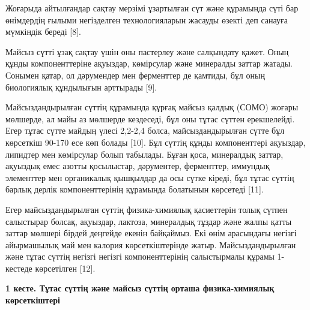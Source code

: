 {Жоғарыда айтылғандар сақтау мерзімі ұзартылған сүт және құрамында сүті
бар өнімдердің ғылыми негізделген технологияларын жасауды өзекті деп
санауға мүмкіндік береді {[}8{]}.

Майсыз сүтті ұзақ сақтау үшін оны пастерлеу және салқындату қажет. Оның
құнды компоненттеріне ақуыздар, көмірсулар және минералды заттар жатады.
Сонымен қатар, ол дәрумендер мен ферменттер де қамтиды, бұл оның
биологиялық құндылығын арттырады {[}9{]}.

Майсыздандырылған сүттің құрамында құрғақ майсыз қалдық (СОМО) жоғары
мөлшерде, ал майы аз мөлшерде кездеседі, бұл оны тұтас сүттен
ерекшелейді. Егер тұтас сүтте майдың үлесі 2,2-2,4 болса,
майсыздандырылған сүтте бұл көрсеткіш 90-170 есе көп болады {[}10{]}.
Бұл сүттің құнды компоненттері ақуыздар, липидтер мен көмірсулар болып
табылады. Бұған қоса, минералдық заттар, ақуыздық емес азотты
қосылыстар, дәрументер, ферменттер, иммундық элементтер мен органикалық
қышқылдар да осы сүтке кіреді, бұл тұтас сүттің барлық дерлік
компоненттерінің құрамында болатынын көрсетеді {[}11{]}.

Егер майсыздандырылған сүттің физика-химиялық қасиеттерін толық сүтпен
салыстырар болсақ, ақуыздар, лактоза, минералдық тұздар және жалпы қатты
заттар мөлшері бірдей деңгейде екенін байқаймыз. Екі өнім арасындағы
негізгі айырмашылық май мен калория көрсеткіштерінде жатыр.
Майсыздандырылған және тұтас сүттің негізгі негізгі компоненттерінің
салыстырмалы құрамы 1-кестеде көрсетілген {[}12{]}.

{\bfseries 1 кесте. Тұтас сүттің және майсыз сүттің орташа физика-химиялық
көрсеткіштері}


}
